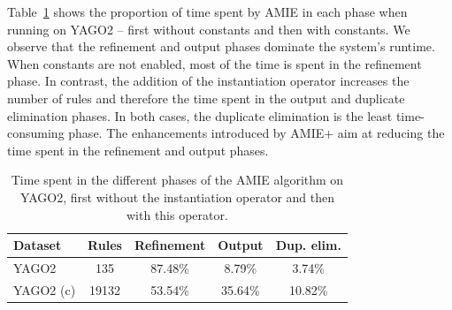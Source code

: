 \noindent Table~\ref{timeProportion} shows the proportion of time spent by AMIE in each phase when running on YAGO2 -- first
without constants and then with constants.
We observe that the refinement and output phases dominate the system's runtime.
When constants are not enabled, most of the time is spent in the refinement phase. In contrast,
the addition of the instantiation operator increases the number of rules and therefore the time
spent in the output and duplicate elimination phases. In both cases,
the duplicate elimination is the least time-consuming phase.
The enhancements introduced by AMIE+ aim at reducing the time spent in the
refinement and output phases.
\begin{center}
\begin{table}
\footnotesize
\begin{tabular}{|l|c|c|c|c|}
\hline
Dataset		& Rules	&  Refinement	& Output 	& Dup. elim.  \\ \hline
YAGO2  		& 135	&  87.48\% 	& 8.79\% 	& 3.74\% \\
YAGO2 (c)  	& 19132	&  53.54\%	& 35.64\% 	& 10.82\% \\ \hline
\end{tabular}
\caption{Time spent in the different phases of the AMIE algorithm on YAGO2, first without the instantiation operator and then with this operator.}
\label{timeProportion}
\end{table}
\end{center}
%
%
%
